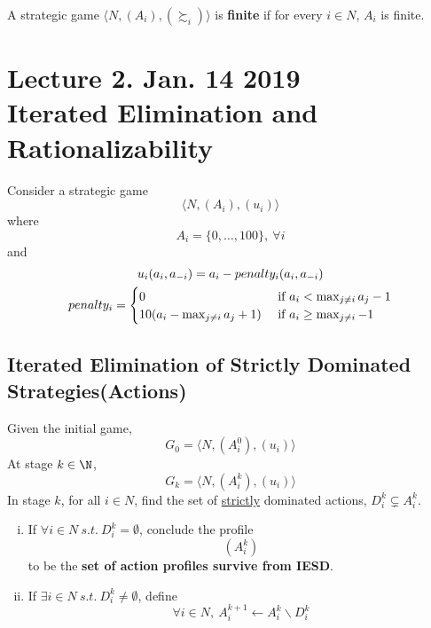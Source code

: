 \documentclass[11pt]{article}
\begin{document}
		\begin{definition}
			A strategic game $\langle N, (A_i), (\succsim_i) \rangle$ is \textbf{finite} if for every $i \in N$, $A_i$ is finite.
		\end{definition}
	
	\section{Lecture 2. Jan. 14 2019\\Iterated Elimination and Rationalizability}
		\begin{example}
			Consider a strategic game
			\begin{equation}
				\langle N, (A_i), (u_i) \rangle
			\end{equation}
			where 
			\begin{equation}
				A_i = \{0,\dots,100\},\ \forall i
			\end{equation}
			and 
			\begin{gather}
				u_i(a_i, a_{-i}) = a_i - penalty_i(a_i, a_{-i}) \\
				penalty_i = \begin{cases}
					0 &\text{{ if }} a_i < \max_{j \neq i} a_j - 1 \\
					10(a_i - \max_{j \neq i} a_j + 1) &\text{{ if }} a_i \geq \max_{j \neq i} - 1
				\end{cases}
			\end{gather}
		\end{example}	
		
		\subsection{Iterated Elimination of Strictly Dominated Strategies(Actions)}
			\begin{definition}[IESD]
				Given the initial game,
				\[
					G_0 = \langle N, (A^0_i), (u_i) \rangle
				\] 
				At stage $k \in \N$, 
				\[
					G_k = \langle N, (A^k_i), (u_i) \rangle
				\]
				In stage $k$, for all $i \in N$, find the set of \ul{strictly} dominated actions, $D_i^k \subsetneq A_i^k$.
				\begin{enumerate}[i)]
					\item If $\forall i \in N\ s.t.\ D_i^k = \emptyset$, conclude the profile
					\[
						(A_i^k)
					\]
					to be the \textbf{set of action profiles survive from IESD}.
					\item If $\exists i \in N\ s.t.\ D_i^k \neq \emptyset$, define
					\[
						\forall i \in N,\ A^{k+1}_i \leftarrow A^k_i \backslash D_i^k
					\]
				\end{enumerate}
			\end{definition}
			
\end{document}
